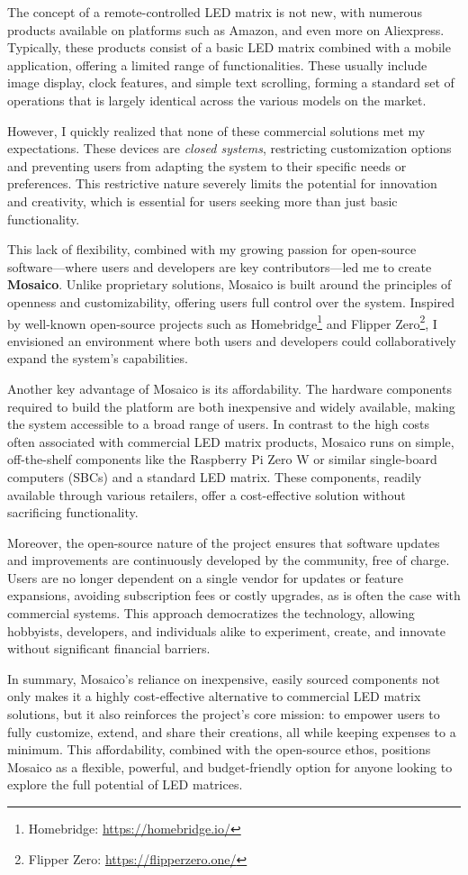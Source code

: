 The concept of a remote-controlled LED matrix is not new, with numerous products available on platforms such as Amazon, and even more on Aliexpress. Typically, these products consist of a basic LED matrix combined with a mobile application, offering a limited range of functionalities. These usually include image display, clock features, and simple text scrolling, forming a standard set of operations that is largely identical across the various models on the market.

However, I quickly realized that none of these commercial solutions met my expectations. These devices are \textit{closed systems}, restricting customization options and preventing users from adapting the system to their specific needs or preferences. This restrictive nature severely limits the potential for innovation and creativity, which is essential for users seeking more than just basic functionality.

This lack of flexibility, combined with my growing passion for open-source software—where users and developers are key contributors—led me to create \textbf{Mosaico}. Unlike proprietary solutions, Mosaico is built around the principles of openness and customizability, offering users full control over the system. Inspired by well-known open-source projects such as Homebridge\footnote{Homebridge: \url{https://homebridge.io/}} and Flipper Zero\footnote{Flipper Zero: \url{https://flipperzero.one/}}, I envisioned an environment where both users and developers could collaboratively expand the system's capabilities.

Another key advantage of Mosaico is its affordability. The hardware components required to build the platform are both inexpensive and widely available, making the system accessible to a broad range of users. In contrast to the high costs often associated with commercial LED matrix products, Mosaico runs on simple, off-the-shelf components like the Raspberry Pi Zero W or similar single-board computers (SBCs) and a standard LED matrix. These components, readily available through various retailers, offer a cost-effective solution without sacrificing functionality.

Moreover, the open-source nature of the project ensures that software updates and improvements are continuously developed by the community, free of charge. Users are no longer dependent on a single vendor for updates or feature expansions, avoiding subscription fees or costly upgrades, as is often the case with commercial systems. This approach democratizes the technology, allowing hobbyists, developers, and individuals alike to experiment, create, and innovate without significant financial barriers.

In summary, Mosaico's reliance on inexpensive, easily sourced components not only makes it a highly cost-effective alternative to commercial LED matrix solutions, but it also reinforces the project's core mission: to empower users to fully customize, extend, and share their creations, all while keeping expenses to a minimum. This affordability, combined with the open-source ethos, positions Mosaico as a flexible, powerful, and budget-friendly option for anyone looking to explore the full potential of LED matrices.
